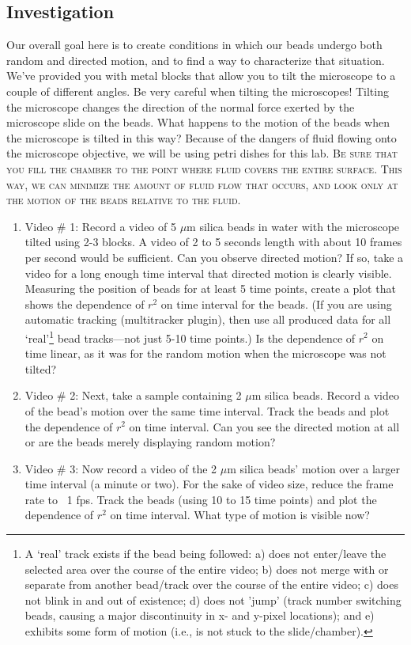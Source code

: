 \subsection*{Investigation}
Our overall goal here is to create conditions in which our beads undergo both random and directed motion, and to find a way to characterize that situation. 
We've provided you with metal blocks that allow you to tilt the microscope to a couple of different angles. 
Be very careful when tilting the microscopes! 
Tilting the microscope changes the direction of the normal force exerted by the microscope slide on the beads. 
What happens to the motion of the beads when the microscope is tilted in this way? 
Because of the dangers of fluid flowing onto the microscope objective, we will be using petri dishes for this lab. 
\textsc{Be sure that you fill the chamber to the point where fluid covers the entire surface.
This way, we can minimize the amount of fluid flow that occurs, and look only at the motion of the beads relative to the fluid.}
\begin{enumerate}
\item Video \# 1: Record a video of 5 $\mu$m silica beads in water with the microscope tilted using 2-3 blocks. A video of 2 to 5 seconds length with about 10 frames per second would be sufficient. Can you observe directed motion? If so, take a video for a long enough time interval that directed motion is clearly visible. Measuring the position of beads for at least 5 time points, create a plot that shows the dependence of $r^{2}$ on time interval for the beads. (If you are using automatic tracking (multitracker plugin), then use all produced data for all `real'\footnote{
A `real' track exists if the bead being followed: a) does not enter/leave the selected area over the course of the entire video; b) does not merge with or separate from another bead/track over the course of the entire video; c) does not blink in and out of existence; d) does not 'jump' (track number switching beads, causing a major discontinuity in x- and y-pixel locations); and e) exhibits some form of motion (i.e., is not stuck to the slide/chamber).} 
bead tracks—not just 5-10 time points.) Is the dependence of $r^{2}$ on time linear, as it was for the random motion when the microscope was not tilted?
\item Video \# 2: Next, take a sample containing 2 $\mu$m silica beads. Record a video of the bead's motion over the same time interval. Track the beads and plot the dependence of $r^{2}$ on time interval. Can you see the directed motion at all or are the beads merely displaying random motion?
\item Video \# 3: Now record a video of the 2 $\mu$m silica beads' motion over a larger time interval (a minute or two). For the sake of video size, reduce the frame rate to ~1 fps. Track the beads (using 10 to 15 time points) and plot the dependence of $r^{2}$ on time interval. What type of motion is visible now?
\end{enumerate}
